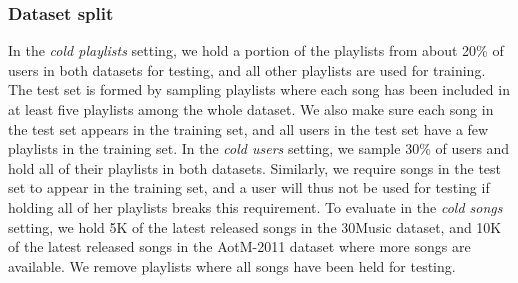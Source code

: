 \subsubsection{Dataset split}
In the \emph{cold playlists} setting,
we hold a portion of the playlists from about 20\% of users in both datasets for testing, 
and all other playlists are used for training.
The test set is formed by sampling playlists where each song has been included in 
at least five playlists among the whole dataset.
We also make sure each song in the test set appears in the training set,
and all users in the test set have a few %
playlists in the training set.
%
In the \emph{cold users} setting,
we sample 30\% of users and hold all of their playlists in both datasets.
Similarly, we require songs in the test set to appear in the training set,
and a user will thus not be used for testing %
if holding all of her playlists breaks this requirement.
%
To evaluate 
in the \emph{cold songs} setting,
we hold 5K of the latest released songs in the 30Music dataset,
and 10K of the latest released songs in the AotM-2011 dataset where more songs are available.
We remove playlists where all songs have been held for testing. %

